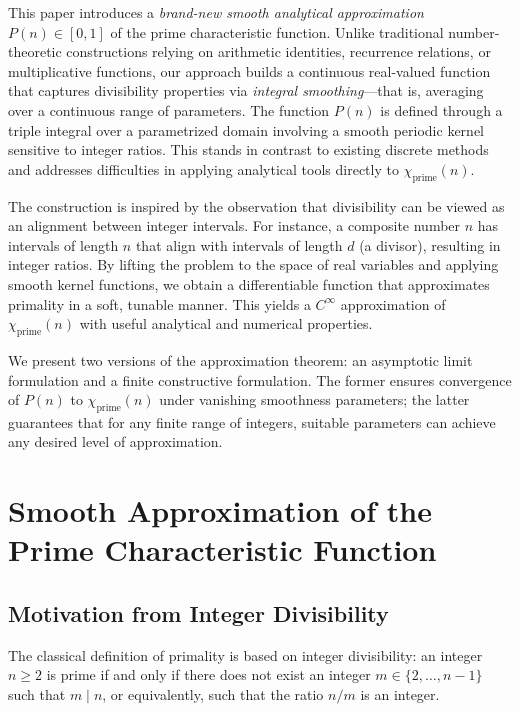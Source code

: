 \documentclass[12pt]{article}
\theoremstyle{definition}
\theoremstyle{plain}
\theoremstyle{remark}
\begin{document}
This paper introduces a \emph{brand-new smooth analytical approximation} \( P(n) \in [0,1] \) of the prime characteristic function. Unlike traditional number-theoretic constructions relying on arithmetic identities, recurrence relations, or multiplicative functions, our approach builds a continuous real-valued function that captures divisibility properties via \emph{integral smoothing}—that is, averaging over a continuous range of parameters. The function \( P(n) \) is defined through a triple integral over a parametrized domain involving a smooth periodic kernel sensitive to integer ratios. This stands in contrast to existing discrete methods and addresses difficulties in applying analytical tools directly to \( \chi_{\mathrm{prime}}(n) \).

The construction is inspired by the observation that divisibility can be viewed as an alignment between integer intervals. For instance, a composite number \( n \) has intervals of length \( n \) that align with intervals of length \( d \) (a divisor), resulting in integer ratios. By lifting the problem to the space of real variables and applying smooth kernel functions, we obtain a differentiable function that approximates primality in a soft, tunable manner. This yields a \( C^\infty \) approximation of \( \chi_{\mathrm{prime}}(n) \) with useful analytical and numerical properties.

We present two versions of the approximation theorem: an asymptotic limit formulation and a finite constructive formulation. The former ensures convergence of \( P(n) \) to \( \chi_{\mathrm{prime}}(n) \) under vanishing smoothness parameters; the latter guarantees that for any finite range of integers, suitable parameters can achieve any desired level of approximation.

\section{Smooth Approximation of the Prime Characteristic Function}

\subsection{Motivation from Integer Divisibility}

The classical definition of primality is based on integer divisibility: an integer \( n \geq 2 \) is prime if and only if there does not exist an integer \( m \in \{2, \dots, n - 1\} \) such that \( m \mid n \), or equivalently, such that the ratio \( n/m \) is an integer.
\end{document}
